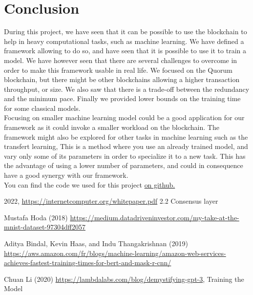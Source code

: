 \documentclass{article}
\begin{document}
\section{Conclusion}
During this project, we have seen that it can be possible to use the blockchain to help in heavy computational tasks, such as
machine learning. We have defined a framework allowing to do so, and have seen that it is possible to use it to train a model.
We have however seen that there are several challenges to overcome in order to make this framework usable in real life.
We focused on the Quorum blockchain, but there might be other blockchains allowing a higher transaction throughput, or size.
We also saw that there is a trade-off between the redundancy and the minimum pace. Finally we provided lower bounds
on the training time for some classical models.\\
Focusing on smaller machine learning model could be a good application for our framework as it could invoke a smaller workload
on the blockchain. The framework might also be explored for other tasks in machine learning such as the transfert learning, This is a method where
you use an already trained model, and vary only some of its parameters in order to specialize it to a new task. This has the
advantage of using a lower number of parameters, and could in consequence have a good synergy with our framework.\\
You can find the code we used for this project \href{https://github.com/douglasbouchet/ml_on_blockchain}{on github.}


\begin{thebibliography}{9}
    2022, \href{DFINITY white paper}{https://internetcomputer.org/whitepaper.pdf} 2.2 Consensus layer

    Mustafa Hoda (2018) \href{https://medium.datadriveninvestor.com/my-take-at-the-mnist-dataset-97304dff2057}{https://medium.datadriveninvestor.com/my-take-at-the-mnist-dataset-97304dff2057}

    Aditya Bindal, Kevin Haas, and Indu Thangakrishnan (2019) \href{https://aws.amazon.com/fr/blogs/machine-learning/amazon-web-services-achieves-fastest-training-times-for-bert-and-mask-r-cnn/}{https://aws.amazon.com/fr/blogs/machine-learning/amazon-web-services-achieves-fastest-training-times-for-bert-and-mask-r-cnn/}

    Chuan Li (2020) \href{https://lambdalabs.com/blog/demystifying-gpt-3}{https://lambdalabs.com/blog/demystifying-gpt-3}, Training the Model

\end{thebibliography}
\end{document}
